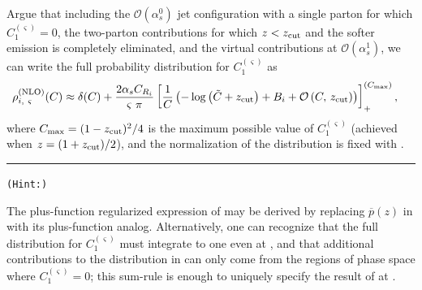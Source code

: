 \begin{exercise}
    \label{ex:constant-subtraction-virtual}
    Argue that including the \(\mathcal{O}(\alpha_s^0)\) jet configuration with a single parton for which \(C_1^{(\varsigma)} = 0\), the two-parton contributions for which \(z < z_{\rm cut}\) and the softer emission is completely eliminated, and the virtual contributions at \(\mathcal{O}(\alpha_s^1)\), we can write the full  probability distribution for \(C_1^{(\varsigma)}\) as
\begin{align}
    \label{eq:plusdist_prsf_nlo}
    \rho^{\rm(NLO)}_{i,~\varsigma}(C)
    &\approx
    \delta(C)
    +
    \frac{2\alpha_s C_{R_i}}{\varsigma~\pi}
    \left[\frac{1}{C}
    \left(
        -\log\left(\tilde C + \zcut\right)
        + B_i
        +
        \mathcal{O}\left(C,\,\zcut\right)
    \right)
    \right]^{(C_{\rm max})}_+
    ,
\end{align}
where \({C_{\rm max}} = (1 - z_{\rm cut})^{2}/4\) is the maximum possible value of \(C_1^{(\varsigma)}\) (achieved when \(z = (1+z_{\rm cut})/2\)), and the normalization of the distribution is fixed with .

\vspace{10pt}
\hrule

\vspace{-3pt}

\begin{center}
\texttt{(Hint:)}
\end{center}

\vspace{-3pt}

\noindent
The plus-function regularized expression of  may be derived by replacing \(\overline{p}(z)\) in  with its plus-function analog.
%
Alternatively, one can recognize that the full distribution for \(C_1^{(\varsigma)}\) must integrate to one even at , and that additional contributions to the  distribution in  can only come from the regions of phase space where \(C_1^{(\varsigma)}=0\);
%
this \gls{sum-rule} is enough to uniquely specify the result of  at .
\end{exercise}



